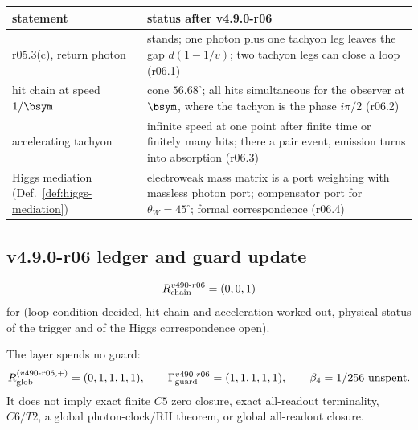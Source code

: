 \begin{center}
\small
\begin{tabular}{@{}>{\raggedright\arraybackslash}p{}>{\raggedright\arraybackslash}p{}@{}}
\toprule
statement & status after v4.9.0-r06\\
\midrule
r05.3(c), return photon & stands; one photon plus one tachyon leg leaves the gap \(d(1-1/v)\); two tachyon legs can close a loop (r06.1)\\
hit chain at speed \(1/\bsym\) & cone \(56.68^\circ\); all hits simultaneous for the observer at \(\bsym\), where the tachyon is the phase \(i\pi/2\) (r06.2)\\
accelerating tachyon & infinite speed at one point after finite time or finitely many hits; there a pair event, emission turns into absorption (r06.3)\\
Higgs mediation (Def.~\ref{def:higgs-mediation}) & electroweak mass matrix is a port weighting with massless photon port; compensator port for \(\theta_W=45^\circ\); formal correspondence (r06.4)\\
\bottomrule
\end{tabular}
\end{center}

\subsection*{v4.9.0-r06 ledger and guard update}
\label{subsec:v490-r06-ledger-guard}

\[
R_{\rm chain}^{v490\text{-}r06}=(0,0,1)
\]
for (loop condition decided, hit chain and acceleration worked out, physical status of the trigger and of the Higgs
correspondence open).

The layer spends no guard:
\[
R_{\rm glob}^{(v490\text{-}r06,+)}=(0,1,1,1,1),
\qquad
\Gamma_{\rm guard}^{v490\text{-}r06}=(1,1,1,1,1),
\qquad
\beta_4=1/256\ \text{unspent}.
\]
It does not imply exact finite \(C5\) zero closure, exact all-readout terminality,
\(C6/T2\), a global photon-clock/RH theorem, or global all-readout closure.

